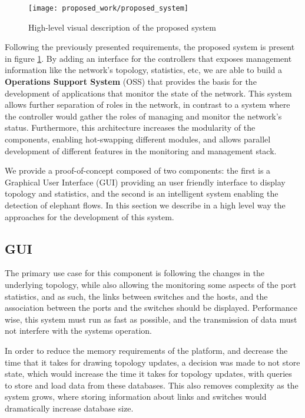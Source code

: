 \begin{figure} [h]
    \centering
    \texttt{[image: proposed\_work/proposed\_system]}
    \caption{High-level visual description of the proposed system} \label{fig:pro_sys}
\end{figure}

\par Following the previously presented requirements, the proposed system is present in figure \ref{fig:pro_sys}. By adding an interface for the controllers that 
exposes management information like the network's topology, statistics, etc, we are able to build a \textbf{Operations Support System} (OSS) that provides the basis 
for the development of applications that monitor the state of the network. This system allows further separation of roles in the network, in contrast to a system 
where the controller would gather the roles of managing and monitor the network's status. Furthermore, this architecture increases the modularity of the components, 
enabling hot-swapping different modules, and allows parallel development of different features in the monitoring and management stack.

\par We provide a proof-of-concept composed of two components: the first is a Graphical User Interface (GUI) providing an user friendly interface to display 
topology and statistics, and the second is an intelligent system enabling the detection of elephant flows. In this section we describe in a high level way the 
approaches for the development of this system.

\subsection {GUI}

The primary use case for this component is following the changes in the underlying topology, while also allowing the monitoring some aspects of the port statistics,
and as such, the links between switches and the hosts, and the association between the ports and the switches should be displayed. Performance wise, this system must
run as fast as possible, and the transmission of data must not interfere with the systems operation. 

\par In order to reduce the memory requirements of the platform, and decrease the time that it takes for drawing topology updates, a decision was made to not store 
state, which would increase the time it takes for topology updates, with queries to store and load data from these databases. This also removes complexity as the 
system grows, where storing information about links and switches would dramatically increase database size.

